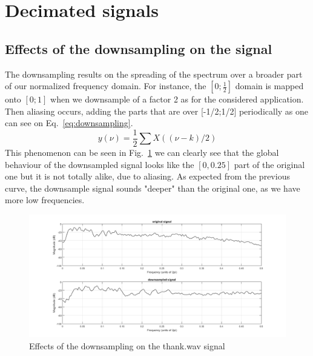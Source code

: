 \documentclass[a4paper,twocolumn]{article}
\begin{document}
\section{Decimated signals}
\label{sec:decimated}

\subsection{Effects of the downsampling on the signal}
The downsampling results on the spreading of the spectrum over a broader part of our normalized frequency domain. For instance, the $[0;\frac{1}{2}]$ domain is mapped onto $[0;1]$ when we downsample of a factor 2 as for the considered application. Then aliasing occurs, adding the parts that are over [-1/2;1/2] periodically as one can see on Eq.~\ref{eq:downsampling}. 
\begin{equation}
  \label{eq:downsampling}
y(\nu)=\frac{1}{2}\sum X((\nu-k)/2)
\end{equation}
This phenomenon can be seen in Fig.~\ref{fig:downsampling} we can clearly see that the global behaviour of the downsampled signal looks like the $[0,0.25]$ part of the original one but it is not totally alike, due to aliasing. As expected from the previous curve, the downsample signal sounds "deeper" than the original one, as we have more low frequencies.

\begin{figure}[!ht]
  \begin{center}
    \includegraphics[width=1.1\columnwidth]{downsampling.png}
  \end{center}
  \caption{Effects of the downsampling on the thank.wav signal}
  \label{fig:downsampling}
\end{figure}
\end{document}
